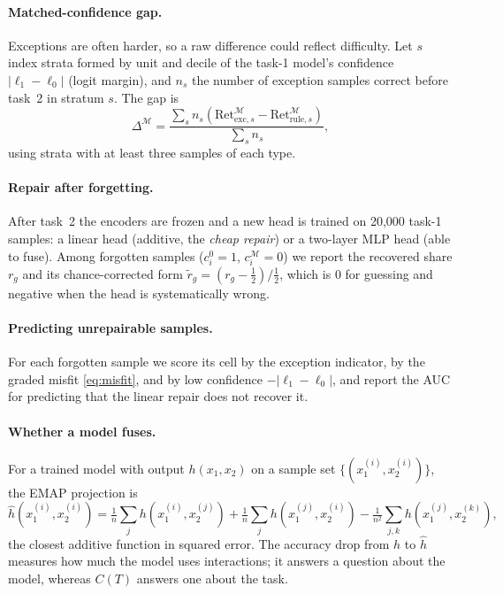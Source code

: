 \documentclass[11pt]{article}
\newcommand{\1}{\mathbf{1}}
\begin{document}
\paragraph{Matched-confidence gap.} Exceptions are often harder, so a raw difference could reflect difficulty. Let
$s$ index strata formed by unit and decile of the task-1 model's confidence $|\ell_1-\ell_0|$ (logit margin), and $n_s$
the number of exception samples correct before task~2 in stratum $s$. The gap is
\begin{equation}
  \Delta^{\mathcal{M}}=\frac{\sum_s n_s\left(\mathrm{Ret}_{\text{exc},s}^{\mathcal{M}}-\mathrm{Ret}_{\text{rule},s}^{\mathcal{M}}\right)}{\sum_s n_s},
\end{equation}
using strata with at least three samples of each type.

\paragraph{Repair after forgetting.} After task~2 the encoders are frozen and a new head is trained on 20{,}000
task-1 samples: a linear head (additive, the \emph{cheap repair}) or a two-layer MLP head (able to fuse). Among
forgotten samples ($c^0_i=1$, $c^{\mathcal{M}}_i=0$) we report the recovered share $r_g$ and its chance-corrected form
$\tilde r_g=(r_g-\tfrac12)/\tfrac12$, which is $0$ for guessing and negative when the head is systematically wrong.

\paragraph{Predicting unrepairable samples.} For each forgotten sample we score its cell by the exception indicator,
by the graded misfit \eqref{eq:misfit}, and by low confidence $-|\ell_1-\ell_0|$, and report the AUC for predicting
that the linear repair does not recover it.

\paragraph{Whether a model fuses.} For a trained model with output $h(x_1,x_2)$ on a sample set $\{(x_1^{(i)},x_2^{(i)})\}$,
the EMAP projection is
\begin{equation}
  \hat h(x_1^{(i)},x_2^{(i)})=\tfrac1n\textstyle\sum_j h(x_1^{(i)},x_2^{(j)})+\tfrac1n\sum_j h(x_1^{(j)},x_2^{(i)})-\tfrac1{n^2}\sum_{j,k}h(x_1^{(j)},x_2^{(k)}),
\end{equation}
the closest additive function in squared error. The accuracy drop from $h$ to $\hat h$ measures how much the model uses
interactions; it answers a question about the model, whereas $C(T)$ answers one about the task.
\end{document}
